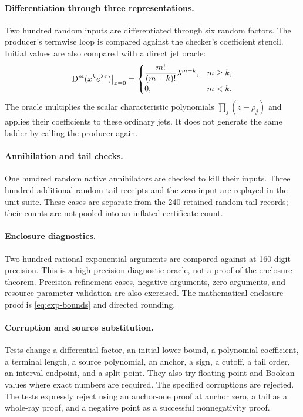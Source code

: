 \paragraph{Differentiation through three representations.}
Two hundred random inputs are differentiated through six random factors.
The producer's termwise loop is compared against the checker's coefficient
stencil. Initial values are also compared with a direct jet oracle:
\[
 \mathrm D^m(x^ke^{\lambda x})\big|_{x=0}
 =\begin{cases}
 \dfrac{m!}{(m-k)!}\lambda^{m-k},&m\ge k,\\
 0,&m<k.
 \end{cases}
\]
The oracle multiplies the scalar characteristic polynomials
$\prod_j(z-\rho_j)$ and applies their coefficients to these ordinary jets.
It does not generate the same ladder by calling the producer again.

\paragraph{Annihilation and tail checks.}
One hundred random native annihilators are checked to kill their inputs.
Three hundred additional random tail receipts and the zero input are replayed
in the unit suite. These cases are separate from the 240 retained random tail
records; their counts are not pooled into an inflated certificate count.

\paragraph{Enclosure diagnostics.}
Two hundred rational exponential arguments are compared against
 at 160-digit precision. This is a high-precision diagnostic
oracle, not a proof of the enclosure theorem. Precision-refinement cases,
negative arguments, zero arguments, and resource-parameter validation are also
exercised. The mathematical enclosure proof is
\eqref{eq:exp-bounds} and directed rounding.

\paragraph{Corruption and source substitution.}
Tests change a differential factor, an initial lower bound, a polynomial
coefficient, a terminal length, a source polynomial, an anchor, a sign, a
cutoff, a tail order, an interval endpoint, and a split point. They also try
floating-point and Boolean values where exact numbers are required. The
specified corruptions are rejected. The tests expressly reject using an
anchor-one proof at anchor zero, a tail as a whole-ray proof, and a negative
point as a successful nonnegativity proof.

